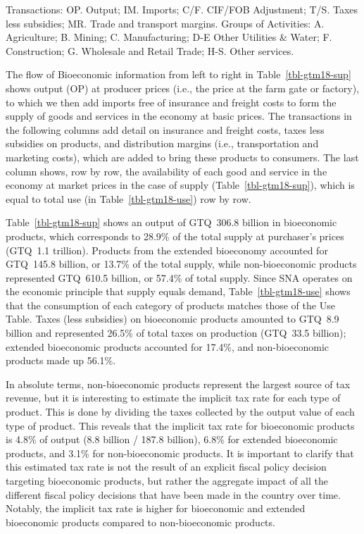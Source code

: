 \documentclass[
  letterpaper,
  DIV=11,
  numbers=noendperiod]{scrartcl}
\begin{document}
Transactions: OP. Output; IM. Imports; C/F. CIF/FOB Adjustment; T/S.
Taxes less subsidies; MR. Trade and transport margins. Groups of
Activities: A. Agriculture; B. Mining; C. Manufacturing; D-E Other
Utilities \& Water; F. Construction; G. Wholesale and Retail Trade; H-S.
Other services.

The flow of Bioeconomic information from left to right in
Table~\ref{tbl-gtm18-sup} shows output (OP) at producer prices (i.e.,
the price at the farm gate or factory), to which we then add imports
free of insurance and freight costs to form the supply of goods and
services in the economy at basic prices. The transactions in the
following columns add detail on insurance and freight costs, taxes less
subsidies on products, and distribution margins (i.e., transportation
and marketing costs), which are added to bring these products to
consumers. The last column shows, row by row, the availability of each
good and service in the economy at market prices in the case of supply
(Table~\ref{tbl-gtm18-sup}), which is equal to total use (in
Table~\ref{tbl-gtm18-use}) row by row.

Table~\ref{tbl-gtm18-sup} shows an output of GTQ~306.8 billion in
bioeconomic products, which corresponds to 28.9\% of the total supply at
purchaser's prices (GTQ~1.1 trillion). Products from the extended
bioeconomy accounted for GTQ~145.8 billion, or 13.7\% of the total
supply, while non-bioeconomic products represented GTQ~610.5 billion, or
57.4\% of total supply. Since SNA operates on the economic principle
that supply equals demand, Table~\ref{tbl-gtm18-use} shows that the
consumption of each category of products matches those of the Use Table.
Taxes (less subsidies) on bioeconomic products amounted to GTQ~8.9
billion and represented 26.5\% of total taxes on production (GTQ~33.5
billion); extended bioeconomic products accounted for 17.4\%, and
non-bioeconomic products made up 56.1\%.

In absolute terms, non-bioeconomic products represent the largest source
of tax revenue, but it is interesting to estimate the implicit tax rate
for each type of product. This is done by dividing the taxes collected
by the output value of each type of product. This reveals that the
implicit tax rate for bioeconomic products is 4.8\% of output (8.8
billion / 187.8 billion), 6.8\% for extended bioeconomic products, and
3.1\% for non-bioeconomic products. It is important to clarify that this
estimated tax rate is not the result of an explicit fiscal policy
decision targeting bioeconomic products, but rather the aggregate impact
of all the different fiscal policy decisions that have been made in the
country over time. Notably, the implicit tax rate is higher for
bioeconomic and extended bioeconomic products compared to
non-bioeconomic products.
\end{document}
